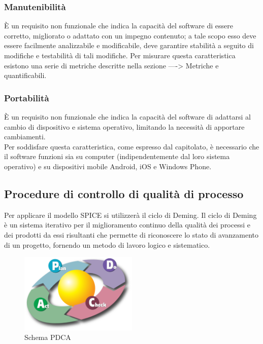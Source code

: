 \subsubsection{Manutenibilità}
È un requisito non funzionale che indica la capacità del software di essere corretto, migliorato o adattato con un impegno contenuto; a tale scopo esso deve essere facilmente analizzabile e modificabile, deve garantire stabilità a seguito di modifiche e testabilità di tali modifiche. 
Per misurare questa caratteristica esistono una serie di metriche descritte nella sezione ----> Metriche e quantificabili.

\subsubsection{Portabilità}
È un requisito non funzionale che indica la capacità del software di adattarsi al cambio di dispositivo e sistema operativo, limitando la necessità di apportare cambiamenti.\\
Per soddisfare questa caratteristica, come espresso dal capitolato, è necessario che il software funzioni sia su computer (indipendentemente dal loro sistema operativo) e su dispositivi mobile Android, iOS e Windows Phone.

\subsection{Procedure di controllo di qualità di processo}
Per applicare il modello SPICE si utilizzerà il ciclo di Deming. Il ciclo di Deming è un sistema iterativo per il miglioramento continuo della qualità dei processi e dei prodotti da essi risultanti che permette di riconoscere lo stato di avanzamento di un progetto, fornendo un metodo di lavoro logico e sistematico.

\begin{figure}[h]
  \centering
    \includegraphics[width=0.5\textwidth]{./images/deming}
  \caption{Schema PDCA}
  \label{fig:deming}
\end{figure}

